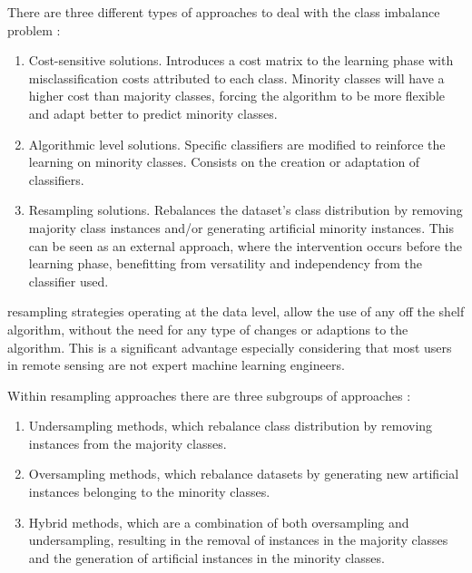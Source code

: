 \documentclass[remotesensing,article,submit,moreauthors,pdftex]{Definitions/mdpi}
\begin{document}
There are three different types of approaches to deal with the class imbalance
problem \cite{Fernandez2013,Kaur2019}:

\begin{enumerate}
    \item Cost-sensitive solutions. Introduces a cost matrix to the learning
        phase with misclassification costs attributed to each class. Minority
        classes will have a higher cost than majority classes, forcing the
        algorithm to be more flexible and adapt better to predict minority
        classes.
    \item Algorithmic level solutions. Specific classifiers are modified to
        reinforce the learning on minority classes. Consists on the creation or
        adaptation of classifiers.
    \item Resampling solutions. Rebalances the dataset's class distribution by
        removing majority class instances and/or generating artificial minority
        instances. This can be seen as an external approach, where the
        intervention occurs before the learning phase, benefitting from
        versatility and independency from the classifier used.
\end{enumerate}

 resampling strategies
 operating at
the data level,  allow the use of any
off the shelf algorithm, without the need for any type of changes or adaptions
to the algorithm. This is a significant advantage especially considering that
most users in remote sensing are not expert machine learning engineers. 

Within resampling approaches there are three subgroups of approaches
\cite{Fernandez2013,Kaur2019,Luengo2020}:

\begin{enumerate}
    \item Undersampling methods, which rebalance class distribution by removing
        instances from the majority classes.
    \item Oversampling methods, which rebalance datasets by generating new
        artificial instances belonging to the minority classes.
    \item Hybrid methods, which are a combination of both oversampling and
        undersampling, resulting in the removal of instances in the majority
        classes and the generation of artificial instances in the minority
        classes.
\end{enumerate}
\end{document}
